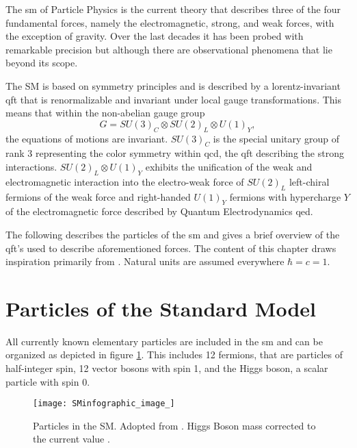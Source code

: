 \noindent The \ac{sm} of Particle Physics is the current theory that describes three of the four fundamental forces, namely the electromagnetic, strong, and weak forces, with the exception of gravity. Over the last decades it has been probed with remarkable precision but although there are  observational phenomena that lie beyond its scope.

The SM is based on symmetry principles and is described by a lorentz-invariant \ac{qft} that is renormalizable and invariant under local gauge transformations. This means that within the non-abelian gauge group
\begin{equation}
    G = SU(3)_C \otimes SU(2)_L \otimes U(1)_Y,
\end{equation}
the equations of motions are invariant. $SU(3)_C$ is the special unitary group of rank 3 representing the color symmetry within \ac{qcd}, the \ac{qft} describing the strong interactions. $SU(2)_L \otimes U(1)_Y$ exhibits the unification of the weak and electromagnetic interaction into the electro-weak force of $SU(2)_L$ left-chiral fermions of the weak force and right-handed $U(1)_Y$ fermions with hypercharge $Y$ of the electromagnetic force described by Quantum Electrodynamics \ac{qed}.

The following describes the particles of the \ac{sm} and gives a brief overview of the \ac{qft}'s used to describe aforementioned forces. The content of this chapter draws inspiration primarily from \citep{hollik2010quantum,griffiths2020introduction,thomson2013modern,zee2010quantum}. Natural units are assumed everywhere $\hbar=c=1$.


\section{Particles of the Standard Model}

All currently known elementary particles are included in the \ac{sm} and can be organized as depicted in figure \ref{fig:sm}. This includes 12 fermions, that are particles of half-integer spin, 12 vector bosons with spin 1, and the Higgs boson, a scalar particle with spin 0.


\begin{figure}
    \centering
    \texttt{[image: SMinfographic\_image\_]}
    \caption[]{Particles in the SM. Adopted from \citep{smpar}. Higgs Boson mass corrected to the current value \citep{particle2022review}. }
    \label{fig:sm}
\end{figure}


